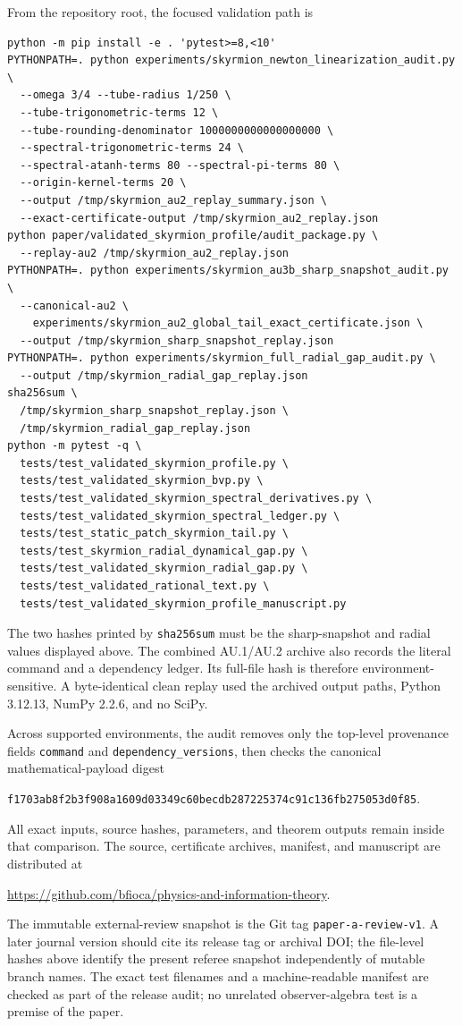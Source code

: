 From the repository root, the focused validation path is
\begin{verbatim}
python -m pip install -e . 'pytest>=8,<10'
PYTHONPATH=. python experiments/skyrmion_newton_linearization_audit.py \
  --omega 3/4 --tube-radius 1/250 \
  --tube-trigonometric-terms 12 \
  --tube-rounding-denominator 1000000000000000000 \
  --spectral-trigonometric-terms 24 \
  --spectral-atanh-terms 80 --spectral-pi-terms 80 \
  --origin-kernel-terms 20 \
  --output /tmp/skyrmion_au2_replay_summary.json \
  --exact-certificate-output /tmp/skyrmion_au2_replay.json
python paper/validated_skyrmion_profile/audit_package.py \
  --replay-au2 /tmp/skyrmion_au2_replay.json
PYTHONPATH=. python experiments/skyrmion_au3b_sharp_snapshot_audit.py \
  --canonical-au2 \
    experiments/skyrmion_au2_global_tail_exact_certificate.json \
  --output /tmp/skyrmion_sharp_snapshot_replay.json
PYTHONPATH=. python experiments/skyrmion_full_radial_gap_audit.py \
  --output /tmp/skyrmion_radial_gap_replay.json
sha256sum \
  /tmp/skyrmion_sharp_snapshot_replay.json \
  /tmp/skyrmion_radial_gap_replay.json
python -m pytest -q \
  tests/test_validated_skyrmion_profile.py \
  tests/test_validated_skyrmion_bvp.py \
  tests/test_validated_skyrmion_spectral_derivatives.py \
  tests/test_validated_skyrmion_spectral_ledger.py \
  tests/test_static_patch_skyrmion_tail.py \
  tests/test_skyrmion_radial_dynamical_gap.py \
  tests/test_validated_skyrmion_radial_gap.py \
  tests/test_validated_rational_text.py \
  tests/test_validated_skyrmion_profile_manuscript.py
\end{verbatim}
The two hashes printed by \texttt{sha256sum} must be the sharp-snapshot and
radial values displayed above.  The combined AU.1/AU.2 archive also records the
literal command and a dependency ledger.  Its full-file hash is therefore
environment-sensitive.  A byte-identical clean replay used the archived output
paths, Python 3.12.13, NumPy 2.2.6, and no SciPy.

Across supported environments, the audit removes only the top-level provenance
fields \texttt{command} and \nolinkurl{dependency_versions}, then checks the
canonical mathematical-payload digest
\begin{center}
\texttt{f1703ab8f2b3f908a1609d03349c60becdb287225374c91c136fb275053d0f85}.
\end{center}
All exact inputs, source hashes, parameters, and theorem outputs remain inside
that comparison.
The source, certificate archives, manifest, and manuscript are distributed at
\begin{center}
\url{https://github.com/bfioca/physics-and-information-theory}.
\end{center}
The immutable external-review snapshot is the Git tag
\texttt{paper-a-review-v1}.  A later journal version should cite its release
tag or archival DOI; the file-level hashes above identify the present referee
snapshot independently of mutable branch names.
The exact test filenames and a machine-readable manifest are checked as part
of the release audit; no unrelated observer-algebra test is a premise of the
paper.

